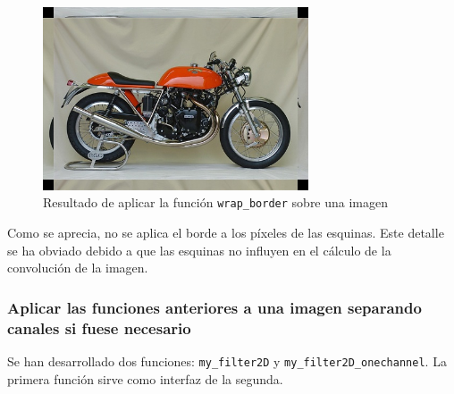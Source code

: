 \documentclass[11pt,a4paper]{article}
\theoremstyle{plain}
\theoremstyle{definition}
\begin{document}
\begin{enumerate}[$\qquad\bullet$]
\begin{figure}[!h]
    \centering
    \includegraphics[width=0.7\textwidth]{borde_wrap}
    \caption{Resultado de aplicar la función \texttt{wrap\_border} sobre una imagen}
    \label{wrap}
\end{figure}
\end{enumerate}

Como se aprecia, no se aplica el borde a los píxeles de las esquinas. Este detalle se ha obviado debido a que las esquinas no influyen en el cálculo de la convolución de la imagen.

\subsubsection{Aplicar las funciones anteriores a una imagen separando canales si fuese necesario}

Se han desarrollado dos funciones: \texttt{my\_filter2D} y \texttt{my\_filter2D\_onechannel}. La primera función sirve como interfaz de la segunda.
\end{document}
